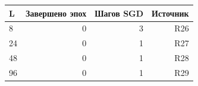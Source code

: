 \begin{tabular}{lrrr}
\toprule
L & Завершено эпох & Шагов SGD & Источник \\
\midrule
8 & 0 & 3 & R26 \\
24 & 0 & 1 & R27 \\
48 & 0 & 1 & R28 \\
96 & 0 & 1 & R29 \\
\bottomrule
\end{tabular}